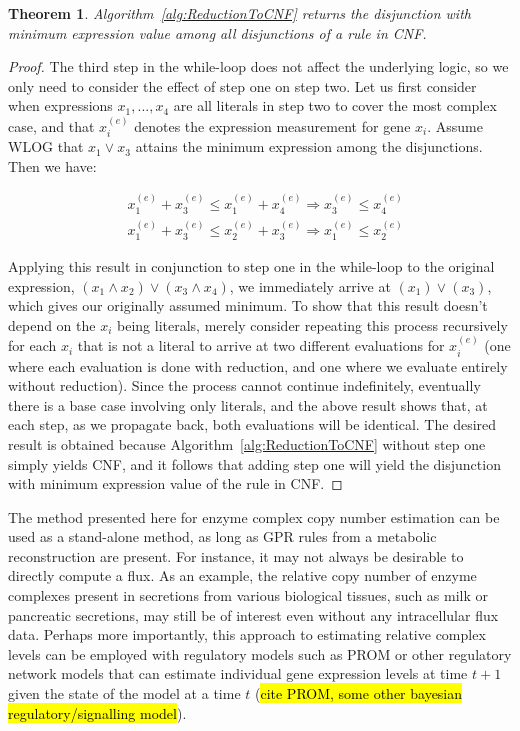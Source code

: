 \documentclass[phd,tocprelim]{cornell}
\newtheorem{Theorem}{Theorem}
\theoremstyle{break}
\theoremstyle{empty}
\begin{document}
\begin{Theorem}
\label{thm:ReductionToCNF}
Algorithm~\ref{alg:ReductionToCNF} returns the disjunction with
minimum expression value among all disjunctions of a rule in CNF.
\end{Theorem}

\begin{proof}
The third step in the while-loop does not affect the
underlying logic, so we only need to consider the effect of step one
on step two.  Let us first consider when expressions $x_1, ..., x_4$
are all literals in step two to cover the most complex case, and that
$x_i^{(e)}$ denotes the expression measurement for gene $x_i$. Assume
WLOG that $x_1 \lor x_3$ attains the minimum expression among the
disjunctions. Then we have:

\begin{align*}
&x_{1}^{(e)} + x_{3}^{(e)} \leq x_{1}^{(e)} + x_{4}^{(e)} \Rightarrow x_{3}^{(e)} \leq x_{4}^{(e)} \\
&x_{1}^{(e)} + x_{3}^{(e)} \leq x_{2}^{(e)} + x_{3}^{(e)} \Rightarrow x_{1}^{(e)} \leq x_{2}^{(e)} 
\end{align*}

Applying this result in conjunction to step one in the while-loop to
the original expression, $(x_1 \land x_2) \lor (x_3 \land x_4)$, we
immediately arrive at $(x_1) \lor (x_3)$, which gives our originally
assumed minimum. To show that this result doesn't depend on the $x_i$
being literals, merely consider repeating this process recursively for
each $x_i$ that is not a literal to arrive at two different
evaluations for $x_i^{(e)}$ (one where each evaluation is done with reduction, 
and one where we evaluate entirely without reduction). 
Since the process cannot continue
indefinitely, eventually there is a base case involving only literals,
and the above result shows that, at each step, as we propagate back,
both evaluations will be identical. The desired result is obtained
because Algorithm~\ref{alg:ReductionToCNF} without step one simply yields CNF,
and it follows that adding step one will yield the disjunction with 
minimum expression value of the rule in CNF.
\end{proof}

The method presented here for enzyme complex copy number estimation
can be used as a stand-alone method, as long as GPR rules from a
metabolic reconstruction are present. For instance, it may not always
be desirable to directly compute a flux. As an example, the relative
copy number of enzyme complexes present in secretions from various
biological tissues, such as milk or pancreatic secretions, may still
be of interest even without any intracellular flux data.  Perhaps more
importantly, this approach to estimating relative complex levels can
be employed with regulatory models such as PROM or other regulatory
network models that can estimate individual gene expression levels at
time $t+1$ given the state of the model at a time $t$ (\hl{cite PROM,
some other bayesian regulatory/signalling model}).
\end{document}
